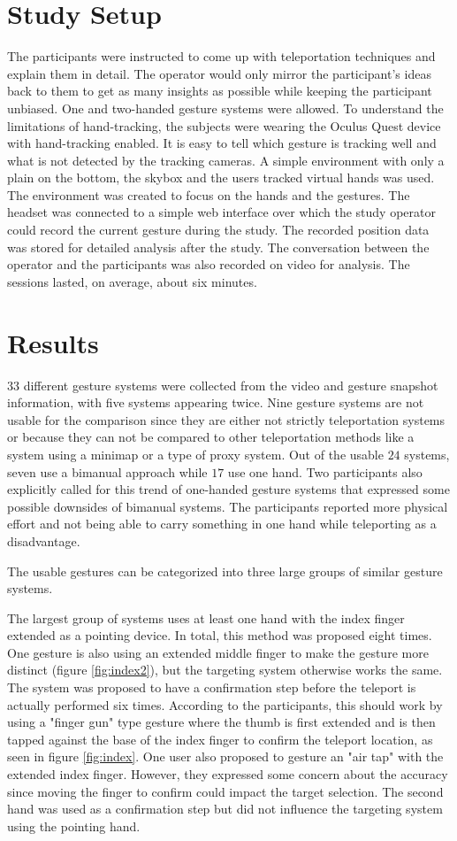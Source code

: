 \section{Study Setup}
The participants were instructed to come up with teleportation techniques and explain them in detail. The operator would only mirror the participant's ideas back to them to get as many insights as possible while keeping the participant unbiased. One and two-handed gesture systems were allowed. To understand the limitations of hand-tracking, the subjects were wearing the Oculus Quest device with hand-tracking enabled. It is easy to tell which gesture is tracking well and what is not detected by the tracking cameras. A simple environment with only a plain on the bottom, the skybox and the users tracked virtual hands was used. The environment was created to focus on the hands and the gestures. The headset was connected to a simple web interface over which the study operator could record the current gesture during the study. The recorded position data was stored for detailed analysis after the study. The conversation between the operator and the participants was also recorded on video for analysis. The sessions lasted, on average, about six minutes.

\section{Results}
$33$ different gesture systems were collected from the video and gesture snapshot information, with five systems appearing twice. Nine gesture systems are not usable for the comparison since they are either not strictly teleportation systems or because they can not be compared to other teleportation methods like a system using a minimap or a type of proxy system. Out of the usable $24$ systems, seven use a bimanual approach while $17$ use one hand. Two participants also explicitly called for this trend of one-handed gesture systems that expressed some possible downsides of bimanual systems. The participants reported more physical effort and not being able to carry something in one hand while teleporting as a disadvantage.

The usable gestures can be categorized into three large groups of similar gesture systems. 

The largest group of systems uses at least one hand with the index finger extended as a pointing device. In total, this method was proposed eight times. One gesture is also using an extended middle finger to make the gesture more distinct (figure \ref{fig:index2}), but the targeting system otherwise works the same. The system was proposed to have a confirmation step before the teleport is actually performed six times. According to the participants, this should work by using a "finger gun" type gesture where the thumb is first extended and is then tapped against the base of the index finger to confirm the teleport location, as seen in figure \ref{fig:index}. One user also proposed to gesture an "air tap" with the extended index finger. However, they expressed some concern about the accuracy since moving the finger to confirm could impact the target selection. The second hand was used as a confirmation step but did not influence the targeting system using the pointing hand.

